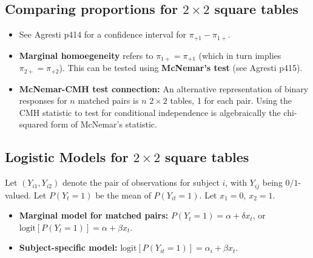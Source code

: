 \documentclass[twoside]{article}
\newcommand\dlt{\delta}
\begin{document}
\subsection*{Comparing proportions for $2 \times 2$ square tables}
\begin{itemize}
\item See Agresti p414 for a confidence interval for $\pi_{+1} - \pi_{1+}$.

\item \textbf{Marginal homoegeneity} refers to $\pi_{1+} = \pi_{+1}$ (which in turn implies $\pi_{2+} = \pi_{+2}$). This can be tested using \textbf{McNemar's test} (see Agresti p415).

\item \textbf{McNemar-CMH test connection:} An alternative representation of binary responses for $n$ matched pairs is $n$ $2 \times 2$ tables, 1 for each pair. Using the CMH statistic to test for conditional independence is algebraically the chi-squared form of McNemar's statistic.
\end{itemize}

\subsection*{Logistic Models for $2 \times 2$ square tables}
Let $(Y_{i1}, Y_{i2})$ denote the pair of observations for subject $i$, with $Y_{ij}$ being $0/1$-valued. Let $P(Y_t=1)$ be the mean of $P(Y_{it} = 1)$. Let $x_1 = 0$, $x_2 = 1$.
\begin{itemize}
\item \textbf{Marginal model for matched pairs:} $P(Y_t = 1) = \alpha + \dlt x_t$, or $\text{logit}[P(Y_t = 1)] = \alpha + \beta x_t$.

\item \textbf{Subject-specific model:} $\text{logit}[P(Y_{it} = 1)] = \alpha_i + \beta x_t$.
\end{itemize}
\end{document}
